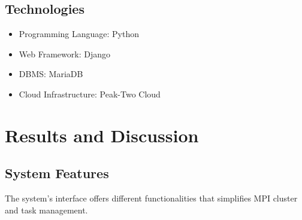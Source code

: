 	
\subsection{Technologies}
	\begin{itemize}
   		\item Programming Language: Python 
   		\item Web Framework: Django  
   		\item DBMS: MariaDB  
   		\item Cloud Infrastructure: Peak-Two Cloud 
	\end{itemize}	
	
\section{Results and Discussion}


          
\subsection{System Features}
The system's interface offers different functionalities that simplifies MPI cluster and task management.
		
